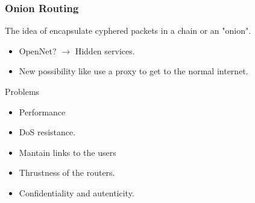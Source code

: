 \begin{frame}
	\frametitle{Onion Routing}
	The idea of encapsulate cyphered packets in a chain or an "onion".

	\begin{itemize}
		\item OpenNet? $\to$ Hidden services.
		\item New possibility like use a proxy to get to the normal
		internet.
	\end{itemize}
	\begin{block}{Problems}
	\begin{itemize}
		\item Performance
		\item DoS resistance.
		\item Mantain links to the users
		\item Thrustness of the routers.
		\item Confidentiality and autenticity.
	\end{itemize}
	\end{block}
\end{frame}

